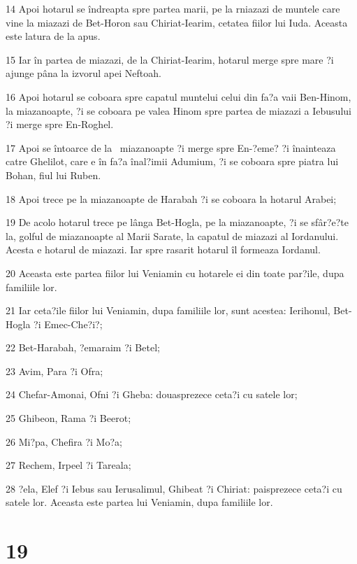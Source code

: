 \par 14 Apoi hotarul se îndreapta spre partea marii, pe la rniazazi de muntele care vine la miazazi de Bet-Horon sau Chiriat-Iearim, cetatea fiilor lui Iuda. Aceasta este latura de la apus.
\par 15 Iar în partea de miazazi, de la Chiriat-Iearim, hotarul merge spre mare ?i ajunge pâna la izvorul apei Neftoah.
\par 16 Apoi hotarul se coboara spre capatul muntelui celui din fa?a vaii Ben-Hinom, la miazanoapte, ?i se coboara pe valea Hinom spre partea de miazazi a Iebusului ?i merge spre En-Roghel.
\par 17 Apoi se întoarce de la  miazanoapte ?i merge spre En-?eme? ?i înainteaza catre Ghelilot, care e în fa?a înal?imii Adumium, ?i se coboara spre piatra lui Bohan, fiul lui Ruben.
\par 18 Apoi trece pe la miazanoapte de Harabah ?i se coboara la hotarul Arabei;
\par 19 De acolo hotarul trece pe lânga Bet-Hogla, pe la miazanoapte, ?i se sfâr?e?te la, golful de miazanoapte al Marii Sarate, la capatul de miazazi al Iordanului. Acesta e hotarul de miazazi. Iar spre rasarit hotarul îl formeaza Iordanul.
\par 20 Aceasta este partea fiilor lui Veniamin cu hotarele ei din toate par?ile, dupa familiile lor.
\par 21 Iar ceta?ile fiilor lui Veniamin, dupa familiile lor, sunt acestea: Ierihonul, Bet-Hogla ?i Emec-Che?i?;
\par 22 Bet-Harabah, ?emaraim ?i Betel;
\par 23 Avim, Para ?i Ofra;
\par 24 Chefar-Amonai, Ofni ?i Gheba: douasprezece ceta?i cu satele lor;
\par 25 Ghibeon, Rama ?i Beerot;
\par 26 Mi?pa, Chefira ?i Mo?a;
\par 27 Rechem, Irpeel ?i Tareala;
\par 28 ?ela, Elef ?i Iebus sau Ierusalimul, Ghibeat ?i Chiriat: paisprezece ceta?i cu satele lor. Aceasta este partea lui Veniamin, dupa familiile lor.

\chapter{19}

